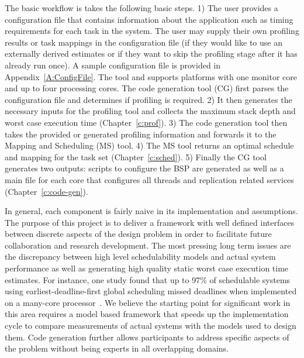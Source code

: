 	The basic workflow is takes the following basic steps. 1) The user provides a configuration file that contains information about the application such as timing requirements for each task in the system. 
	The user may supply their own profiling results or task mappings in the configuration file (if they would like to use an externally derived estimates or if they want to skip the profiling stage after it has already run once). 
	A sample configuration file is provided in Appendix~\ref{A:ConfigFile}. 
	The tool and supports platforms with one monitor core and up to four processing cores.
	The code generation tool (CG) first parses the configuration file and determines if profiling is required. 
	2) It then generates the necessary inputs for the profiling tool and collects the maximum stack depth and worst case execution time (Chapter~\ref{c:prof}). 
	3) The code generation tool then takes the provided or generated profiling information and forwards it to the Mapping and Scheduling (MS) tool. 
	4) The MS tool returns an optimal schedule and mapping for the task set (Chapter~\ref{c:sched}). 
	5) Finally the CG tool generates two outputs: scripts to configure the BSP are generated as well as a main file for each core that configures all threads and replication related services (Chapter~\ref{c:code-gen}). 	
	
	
	
	In general, each component is fairly naive in its implementation and assumptions. 
	The purpose of this project is to deliver a framework with well defined interfaces between discrete aspects of the design problem in order to facilitate future collaboration and research development. 
	The most pressing long term issues are the discrepancy between high level schedulability models and actual system performance as well as generating high quality static worst case execution time estimates.
	For instance, one study found that up to 97\% of schedulable systems using earliest-deadline-first global scheduling missed deadlines when implemented on a many-core processor~\cite{sigrist2015mixed}.
	We believe the starting point for significant work in this area requires a model based framework that speeds up the implementation cycle to compare measurements of actual systems with the models used to design them.
	Code generation further allows participants to address specific aspects of the problem without being experts in all overlapping domains.

